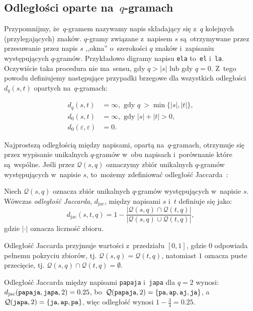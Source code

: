 \documentclass{praca1}
\begin{document}
\subsection{Odległości oparte na~$q$-gramach}

Przypomnijmy, że~$q$-gramem nazywamy napis składający się z~$q$ kolejnych (przylegających) znaków. $q$-gramy związane z~napisem $s$ są~otrzymywane przez przesuwanie przez napis $s$ ,,okna'' o~szerokości $q$ znaków i~zapisaniu występujących $q$-gramów. Przykładowo digramy napisu \verb|ela| to~\verb|el| i~\verb|la|. Oczywiście taka procedura nie ma~sensu, gdy $q > |s|$ lub gdy $q = 0$. Z~tego powodu definiujemy następujące przypadki brzegowe dla wszystkich odległości $d_q(s,t)$ opartych na~$q$-gramach:

\begin{align*}
d_q(s,t) &= \infty, \text{ gdy } q~> \min\{|s|, |t|\},\\
d_0(s,t) &= \infty, \text{ gdy } |s| + |t| > 0, \\
d_0(\varepsilon,\varepsilon) &= 0.
\end{align*}

Najprostszą odległością między napisami, opartą na~$q$-gramach, otrzymuje się przez wypisanie unikalnych $q$-gramów w~obu napisach i~porównanie które są~wspólne. Jeśli przez $\mathcal{Q}(s,q)$ oznaczymy zbiór unikalnych $q$-gramów występujących w~napisie $s$, to~możemy zdefiniować odległość Jaccarda~\cite{Loo2014:stringdist}:

\begin{definition}
Niech $\mathcal{Q}(s,q)$ oznacza zbiór unikalnych $q$-gramów występujących w~napisie $s$. Wówczas \emph{odległość Jaccarda}, $d_{\mathrm{jac}}$, między napisami $s$ i~$t$ definiuje się jako:
\begin{equation*}
d_{\mathrm{jac}}(s,t,q) = 1 - \frac{|\mathcal{Q}(s,q) \cap \mathcal{Q}(t,q)|}{|\mathcal{Q}(s,q) \cup \mathcal{Q}(t,q)|},
\end{equation*}
gdzie $|\cdot|$ oznacza liczność zbioru.
\end{definition} 

Odległość Jaccarda przyjmuje wartości z~przedziału $[0,1]$, gdzie $0$ odpowiada pełnemu pokryciu zbiorów, tj. $\mathcal{Q}(s,q) = \mathcal{Q}(t,q)$, natomiast $1$ oznacza puste przecięcie, tj. \hbox{$\mathcal{Q}(s,q) \cap \mathcal{Q}(t,q) = \emptyset$.}

\begin{example}
Odległość Jaccarda między napisami \verb|papaja| i~\verb|japa| dla $q = 2$ wynosi: $d_{\mathrm{jac}}(\verb|papaja|, \verb|japa|, 2)  = 0.25$, bo~$\mathcal{Q}(\verb|papaja|, 2) = \{\verb|pa|, \verb|ap|, \verb|aj|, \verb|ja|\}$, a~$\mathcal{Q}(\verb|japa|, 2) = \{\verb|ja|, \verb|ap|, \verb|pa|\}$, więc odległość wynosi $1 - \frac{3}{4} = 0.25$.
\end{example}
\end{document}
